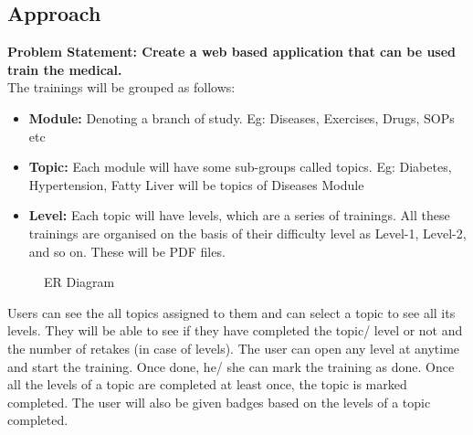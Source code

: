 \documentclass[a4paper,11pt]{article}
\begin{document}
\subsection{Approach}
\textbf{Problem Statement: Create a web based application that can be used train the medical.}
\medskip\\
The trainings will be grouped as follows:
\begin{itemize}
    \item \textbf{Module: } Denoting a branch of study. Eg: Diseases, Exercises, Drugs, SOPs etc
    \item \textbf{Topic: } Each module will have some sub-groups called topics. Eg: Diabetes, Hypertension, Fatty Liver will be topics of Diseases Module
    \item \textbf{Level: } Each topic will have levels, which are a series of trainings. All these trainings are organised on the basis of their difficulty level as Level-1, Level-2, and so on. These will be PDF files.
\end{itemize}
\begin{figure}[ht]
    \centering
    \caption{ER Diagram}
    \label{fig:er}
\end{figure}
Users can see the all topics assigned to them and can select a topic to see all its levels. They will be able to see if they have completed the topic/ level or not and the number of retakes (in case of levels). The user can open any level at anytime and start the training. Once done, he/ she can mark the training as done. Once all the levels of a topic are completed at least once, the topic is marked completed. The user will also be given badges based on the levels of a topic completed.
\end{document}

